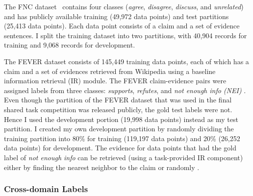 \documentclass{article}
\begin{document}
{} 
The FNC dataset~\citep*{pomerleau2017fake} contains four classes (\textit{agree}, \textit{disagree}, \textit{discuss}, and \textit{unrelated}) and has publicly available training (49,972 data points) and test partitions (25,413 data points). Each data point consists of a claim and a set of evidence sentences.  I split the training dataset into two partitions, with 40,904 records for training and 9,068 records for development.

{} The FEVER \citep*{thorne2018fever} dataset consists of 145,449 training data points, each of which has a claim and a set of evidences retrieved from Wikipedia using a baseline information retrieval (IR) module.
The FEVER claim-evidence pairs were assigned labels from three classes: \textit{supports}, \textit{refutes}, and \textit{not enough info (NEI)} . Even though the partition of the FEVER dataset that was used in the final shared task competition was released publicly, the gold test labels were not. Hence I used the development portion (19,998 data points) instead as my test partition. I created my own development partition by randomly dividing the training partition into 80\% for training (119,197 data points) and 20\% (26,252 data points) for development.  The evidence for data points that had the gold label of \textit{not enough info} can be retrieved (using a task-provided IR component) either by finding the nearest neighbor to the claim or randomly \citep*{thorne2018fever}. 


\subsubsection{Cross-domain Labels}
\label{sec:crossdomain}
\end{document}
